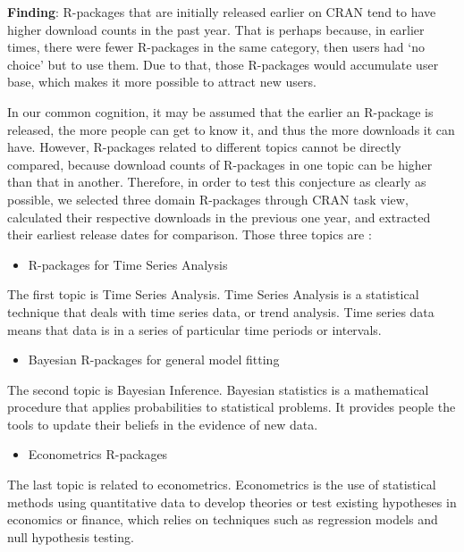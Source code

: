 \documentclass[
]{book}
\providecommand{\tightlist}{%
  \setlength{\itemsep}{0pt}\setlength{\parskip}{0pt}}
\newenvironment{discovery}[1]{%
  \begin{tcolorbox}[colback=blue!30,colframe=blue!80!black]#1}{\end{tcolorbox}}
\begin{document}
\begin{discovery}
\textbf{Finding}: R-packages that are initially released earlier on CRAN
tend to have higher download counts in the past year. That is perhaps
because, in earlier times, there were fewer R-packages in the same
category, then users had `no choice' but to use them. Due to that, those
R-packages would accumulate user base, which makes it more possible to
attract new users.
\end{discovery}

In our common cognition, it may be assumed that the earlier an R-package is released, the more people can get to know it, and thus the more downloads it can have. However, R-packages related to different topics cannot be directly compared, because download counts of R-packages in one topic can be higher than that in another. Therefore, in order to test this conjecture as clearly as possible, we selected three domain R-packages through CRAN task view\autocite{crantaskviews}, calculated their respective downloads in the previous one year, and extracted their earliest release dates for comparison. Those three topics are :

\begin{itemize}
\tightlist
\item
  R-packages for Time Series Analysis
\end{itemize}

The first topic is Time Series Analysis. Time Series Analysis is a statistical technique that deals with time series data, or trend analysis. Time series data means that data is in a series of particular time periods or intervals\autocite{timeseries}.

\begin{itemize}
\tightlist
\item
  Bayesian R-packages for general model fitting
\end{itemize}

The second topic is Bayesian Inference. Bayesian statistics is a mathematical procedure that applies probabilities to statistical problems. It provides people the tools to update their beliefs in the evidence of new data\autocite{bayesian}.

\begin{itemize}
\tightlist
\item
  Econometrics R-packages
\end{itemize}

The last topic is related to econometrics. Econometrics is the use of statistical methods using quantitative data to develop theories or test existing hypotheses in economics or finance, which relies on techniques such as regression models and null hypothesis testing\autocite{econometrics}.
\end{document}
